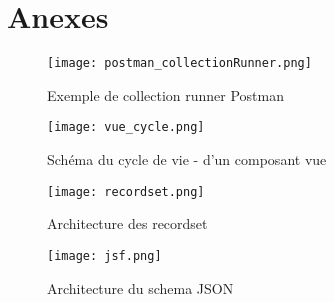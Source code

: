 \section{Anexes}

\begin{figure}[htbp]
    \center
    \texttt{[image: postman\_collectionRunner.png]}
    \label{fig:postman_collectionRunner}
    \caption{Exemple de collection runner Postman}
\end{figure}

\begin{figure}[htbp]
    \center
    \texttt{[image: vue\_cycle.png]}
    \label{fig:vue_cycle}
    \caption{Schéma du cycle de vie - d'un composant vue\cite{vuelifecycle}}
\end{figure}
    
\begin{figure}[htbp]
    \center 
    \texttt{[image: recordset.png]}
    \label{fig:recordset}
    \caption{Architecture des recordset}
\end{figure}
\begin{figure}
    \center 
    \texttt{[image: jsf.png]}
    \label{fig:jsf}
    \caption{Architecture du schema JSON}
\end{figure}